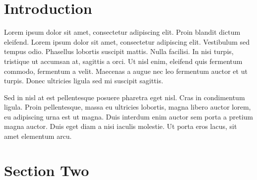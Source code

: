 \documentclass{carver-cyberlaw}
\begin{document}
\section{Introduction}

Lorem ipsum dolor sit amet, consectetur adipiscing elit. Proin blandit dictum eleifend. Lorem ipsum dolor sit amet, consectetur adipiscing elit. Vestibulum sed tempus odio. Phasellus lobortis suscipit mattis. Nulla facilisi. In nisi turpis, tristique ut accumsan at, sagittis a orci. Ut nisl enim, eleifend quis fermentum commodo, fermentum a velit. Maecenas a augue nec leo fermentum auctor et ut turpis. Donec ultricies ligula sed mi suscipit sagittis.

Sed in nisl at est pellentesque posuere pharetra eget nisl. Cras in condimentum ligula. Proin pellentesque, massa eu ultricies lobortis, magna libero auctor lorem, eu adipiscing urna est ut magna. Duis interdum enim auctor sem porta a pretium magna auctor. Duis eget diam a nisi iaculis molestie. Ut porta eros lacus, sit amet elementum arcu.

\section{Section Two}
\end{document}

